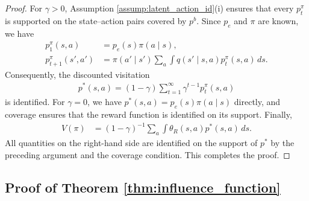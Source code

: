 \documentclass[12pt]{article}
\newcommand{\0}{\boldsymbol{0}}
\begin{document}
\begin{proof}
For $\gamma>0$, Assumption \ref{assump:latent_action_id}(i) ensures that every $p_t^\pi$ is supported on the state--action pairs covered by $p^b$. Since $p_e$ and $\pi$ are known, we have
\begin{align*}
    p_1^\pi(s,a)&=p_e(s)\pi(a\mid s),\\
    p_{t+1}^\pi(s',a')&=\pi(a'\mid s')\sum_a\int q(s'\mid s,a)p_t^\pi(s,a)\,ds.
\end{align*}
Consequently, the discounted visitation
\begin{gather*}
    p^*(s,a)=(1-\gamma)\sum_{t=1}^\infty\gamma^{t-1}p_t^\pi(s,a)
\end{gather*}
is identified. For $\gamma=0$, we have $p^*(s,a)=p_e(s)\pi(a\mid s)$ directly, and coverage ensures that the reward function is identified on its support. Finally,
\begin{align*}
    V(\pi)
    &=(1-\gamma)^{-1}\sum_a\int\theta_R(s,a)p^*(s,a)\,ds.
\end{align*}
All quantities on the right-hand side are identified on the support of $p^*$ by the preceding argument and the coverage condition. This completes the proof.
\end{proof}

\subsection{Proof of Theorem \ref{thm:influence_function}}
\end{document}
